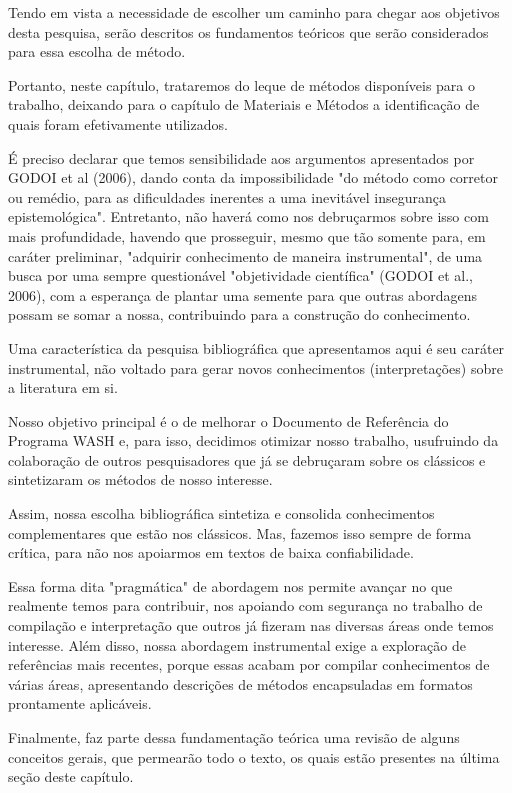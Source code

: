 Tendo em vista a necessidade de escolher um caminho para chegar  aos objetivos desta pesquisa, serão descritos os fundamentos teóricos que serão considerados para essa escolha de método.

Portanto, neste capítulo, trataremos do leque de métodos disponíveis para o trabalho, deixando para o capítulo de Materiais e Métodos a identificação de quais foram efetivamente utilizados.

É preciso declarar que temos sensibilidade aos argumentos apresentados por GODOI et al (2006), dando conta da impossibilidade "do método como corretor ou remédio, para as dificuldades inerentes a uma inevitável insegurança epistemológica". Entretanto, não haverá como nos debruçarmos sobre isso com mais profundidade, havendo que prosseguir, mesmo que tão somente para, em caráter preliminar, "adquirir conhecimento de maneira instrumental", de uma busca por uma sempre questionável "objetividade científica" (GODOI et al., 2006), com a esperança de plantar uma semente para que outras abordagens possam se somar a nossa, contribuindo para a construção do conhecimento.

Uma característica da pesquisa bibliográfica que apresentamos aqui é seu  caráter instrumental, não voltado para gerar novos conhecimentos (interpretações) sobre a literatura em si.

Nosso objetivo principal é o de melhorar o Documento de Referência do Programa WASH e, para isso, decidimos otimizar nosso trabalho, usufruindo da colaboração de outros pesquisadores que já se debruçaram sobre os clássicos e  sintetizaram os métodos de nosso interesse.

Assim, nossa escolha bibliográfica sintetiza e consolida conhecimentos complementares que estão nos clássicos. Mas, fazemos isso sempre de forma crítica, para não nos apoiarmos em textos de baixa confiabilidade.

Essa forma dita "pragmática" de abordagem nos permite avançar no que realmente temos para contribuir, nos apoiando com segurança no trabalho de compilação e interpretação que outros já fizeram nas diversas áreas onde temos interesse. Além disso, nossa abordagem instrumental exige a exploração de referências mais recentes, porque essas acabam por compilar conhecimentos de várias áreas, apresentando descrições de métodos encapsuladas em formatos prontamente aplicáveis.

Finalmente, faz parte dessa fundamentação teórica uma revisão de alguns conceitos gerais, que permearão todo o texto, os quais estão presentes na última seção deste capítulo.

